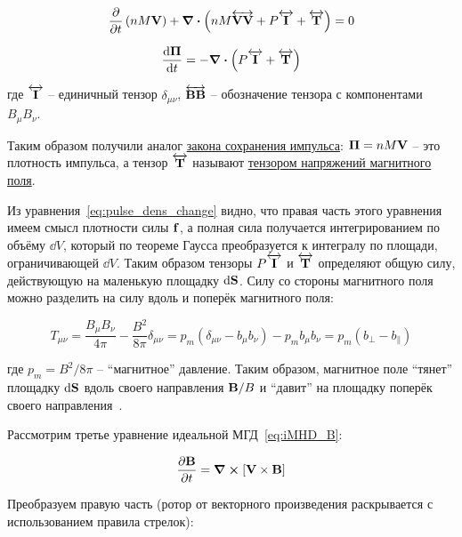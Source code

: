 \documentclass[10pt, a4paper]{article}
\begin{document}
\begin{equation*}
	\pdv{}{t}\left( nM\vb{V} \right) + \div{\left( nM\overleftrightarrow{\vb{VV}} + P\overleftrightarrow{\vb{I}} + \overleftrightarrow{\vb{T}} \right)} = 0
\end{equation*}

\begin{equation}
	\label{eq:pulse_dens_change}
	\dv{\vb{\Pi}}{t} = - \div{\left( P\overleftrightarrow{\vb{I}} + \overleftrightarrow{\vb{T}} \right)}
\end{equation}

где $\overleftrightarrow{\vb{I}}$ -- единичный тензор $\delta_{\mu\nu}$, $\overleftrightarrow{\vb{BB}}$ -- обозначение тензора с компонентами $B_\mu B_\nu$.

Таким образом получили аналог \uline{закона сохранения импульса}: $\vb{\Pi}=nM\vb{V}$ -- это плотность импульса, а тензор $\overleftrightarrow{\vb{T}}$ называют \uline{тензором напряжений магнитного поля}. 	

Из уравнения~\eqref{eq:pulse_dens_change} видно, что правая часть этого уравнения имеем смысл плотности силы $\vb{f}$, а полная сила получается интегрированием по объёму $\dd V$, который по теореме Гаусса преобразуется к интегралу по площади, ограничивающей $\dd V$. Таким образом тензоры $P\overleftrightarrow{\vb{I}}$ и $\overleftrightarrow{\vb{T}}$ определяют общую силу, действующую на маленькую площадку $\dd\vb{S}$.
Силу со стороны магнитного поля можно разделить на силу вдоль и поперёк магнитного поля:

\begin{equation*}
	T_{\mu\nu} = \frac{B_\mu B_\nu}{4\pi}-\frac{B^2}{8\pi}\delta_{\mu\nu} = p_m \left( \delta_{\mu\nu} - b_\mu b_\nu \right) - p_m b_\mu b_\nu = p_m (b_\perp - b_\parallel)
\end{equation*}

где $p_m = B^2 / 8 \pi$ -- ``магнитное'' давление. Таким образом, магнитное поле ``тянет'' площадку $\dd \vb{S}$ вдоль своего направления $\vb{B}/B$ и ``давит'' на площадку поперёк своего направления~\cite{kotelnikov}.

Рассмотрим третье уравнение идеальной МГД~\eqref{eq:iMHD_B}:

\begin{equation*}
	\pdv{\vb{B}}{t} = \curl{[\vb{V}\times\vb{B}]}
\end{equation*}

Преобразуем правую часть (ротор от векторного произведения раскрывается с использованием правила стрелок):
\end{document}
